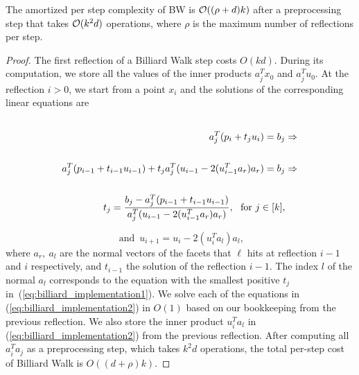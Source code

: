    \begin{lem}
   \label{lem:BW-step-cost}
   The amortized per step complexity of BW is $\mathcal{O}((\rho + d)k)$ after a preprocessing step that takes $\mathcal{O}(k^2d)$ operations, where $\rho$ is the maximum number of reflections per step.
   \end{lem}


   \begin{proof}
      The first reflection of a Billiard Walk step costs $O(kd)$.
      During its computation, we store all the values of the inner
      products $a_j^Tx_0$ and $a_j^Tu_0$.
      At the reflection $i>0$, we start from a point $x_i$
      and the solutions of the corresponding linear equations are
      \label{eq:billiard_implementation1}
      \begin{equation*}
      \begin{split}
         \cr a_j^T(p_i + t_ju_i) = b_j & \Rightarrow \\
         \cr a_j^T(p_{i-1} + t_{i-1}u_{i-1})
         + t_ja_j^T(u_{i-1}-2(u_{i-1}^Ta_r) a_r) = b_j  & \Rightarrow \\
         \cr t_j = \frac{b_j - a_j^T(p_{i-1} +  t_{i-1}u_{i-1})}{a_j^T(u_{i-1}-2(u_{i-1}^Ta_r) a_r)},\
         \text{ for }  j \in [k]  ,
         \end{split}
      \end{equation*}

      \begin{equation}\label{eq:billiard_implementation2}
      \text{ and } \, u_{i+1} = u_i -2(u_i^Ta_l) a_l,
      \end{equation}
      where $a_r,\ a_l$ are the normal vectors of the facets that $\ell$ hits at reflection $i-1$ and $i$ respectively, and $t_{i-1}$ the solution of the  reflection $i-1$.
      The index $l$ of the normal $a_l$
      corresponds to the equation with the smallest positive $t_j$
      in~(\ref{eq:billiard_implementation1}).
      We solve each of the  equations in (\ref{eq:billiard_implementation2}) in $O(1)$ based on our bookkeeping from the  previous reflection.
      We also store the inner product $u_i^Ta_l$ in (\ref{eq:billiard_implementation2}) from the  previous reflection.
      After computing all $a_i^Ta_j$ as a preprocessing step, which takes $k^2d$ operations, the total per-step cost of Billiard Walk is $O((d+\rho)k)$.
   \end{proof}

